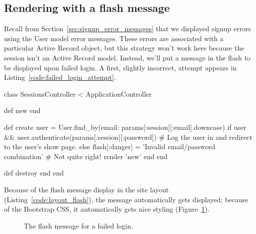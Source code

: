 
    \subsection{Rendering with a flash message} %
    \label{sec:rendering_with_a_flash_message}

Recall from Section~\ref{sec:signup_error_messages} that we displayed signup errors using the User model error messages. These errors are associated with a particular Active Record object, but this strategy won't work here because the session isn't an Active Record model. Instead, we'll put a message in the flash to be displayed upon failed login. A first, slightly incorrect, attempt appears in Listing~\ref{code:failed_login_attempt}.

\begin{codelisting}
\label{code:failed_login_attempt}
\begin{code}
class SessionsController < ApplicationController

  def new
  end

  def create
    user = User.find_by(email: params[:session][:email].downcase)
    if user && user.authenticate(params[:session][:password])
      # Log the user in and redirect to the user's show page.
    else
      flash[:danger] = 'Invalid email/password combination' # Not quite right!
      render 'new'
    end
  end

  def destroy
  end
end
\end{code}
\end{codelisting}

\noindent Because of the flash message display in the site layout (Listing~\ref{code:layout_flash}), the  message automatically gets displayed; because of the Bootstrap CSS, it automatically gets nice styling (Figure~\ref{fig:failed_login_flash}).

\begin{figure}
\begin{center}
\end{center}
\caption{The flash message for a failed login.\label{fig:failed_login_flash}}
\end{figure}

